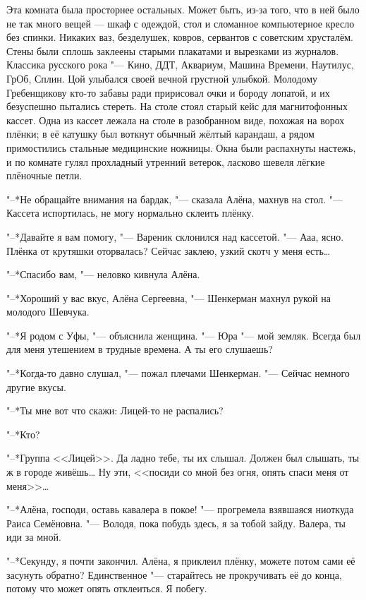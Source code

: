 Эта комната была просторнее остальных.
Может быть, из-за того, что в ней было не так много вещей --- шкаф с одеждой, стол и сломанное компьютерное кресло без спинки.
Никаких ваз, безделушек, ковров, сервантов с советским хрусталём.
Стены были сплошь заклеены старыми плакатами и вырезками из журналов.
Классика русского рока "--- Кино, ДДТ, Аквариум, Машина Времени, Наутилус, ГрОб, Сплин.
Цой улыбался своей вечной грустной улыбкой.
Молодому Гребенщикову кто-то забавы ради пририсовал очки и бороду лопатой, и их безуспешно пытались стереть.
На столе стоял старый кейс для магнитофонных кассет.
Одна из кассет лежала на столе в разобранном виде, похожая на ворох плёнки;
в её катушку был воткнут обычный жёлтый карандаш, а рядом примостились стальные медицинские ножницы.
Окна были распахнуты настежь, и по комнате гулял прохладный утренний ветерок, ласково шевеля лёгкие плёночные петли.

"--*Не обращайте внимания на бардак, "--- сказала Алёна, махнув на стол.
"--- Кассета испортилась, не могу нормально склеить плёнку.

"--*Давайте я вам помогу, "--- Вареник склонился над кассетой.
"--- Ааа, ясно.
Плёнка от крутяшки оторвалась?
Сейчас заклею, узкий скотч у меня есть\ldots{}

"--*Спасибо вам, "--- неловко кивнула Алёна.

"--*Хороший у вас вкус, Алёна Сергеевна, "--- Шенкерман махнул рукой на молодого Шевчука.

"--*Я родом с Уфы, "--- объяснила женщина.
"--- Юра "--- мой земляк.
Всегда был для меня утешением в трудные времена.
А ты его слушаешь?

"--*Когда-то давно слушал, "--- пожал плечами Шенкерман.
"--- Сейчас немного другие вкусы.

"--*Ты мне вот что скажи: Лицей-то не распались?

"--*Кто?

"--*Группа <<Лицей>>.
Да ладно тебе, ты их слышал.
Должен был слышать, ты ж в городе живёшь\ldots{}
Ну эти, <<посиди со мной без огня, опять спаси меня от меня>>\ldots{}

"--*Алёна, господи, оставь кавалера в покое! "--- прогремела взявшаяся ниоткуда Раиса Семёновна.
"--- Володя, пока побудь здесь, я за тобой зайду.
Валера, ты иди за мной.

"--*Секунду, я почти закончил.
Алёна, я приклеил плёнку, можете потом сами её засунуть обратно?
Единственное "--- старайтесь не прокручивать её до конца, потому что может опять отклеиться.
Я побегу.


